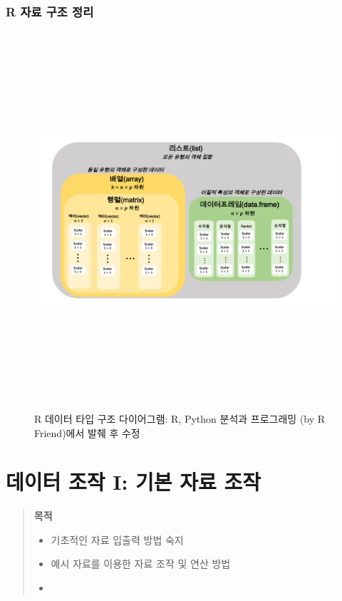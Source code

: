 \documentclass[11pt,a4paper]{book}
\theoremstyle{definition}
\theoremstyle{definition}
\theoremstyle{definition}
\theoremstyle{remark}
\begin{document}
\normalsize

\subsection{R 자료 구조 정리}\label{r---}

\begin{figure}[H] {
  \centering
  \includegraphics[width = 15cm, height = 14cm]{Figures/datatype-diagram}
  \caption[R 데이터 타입 구조 다이어그램]{R 데이터 타입 구조 다이어그램: R, Python 분석과 프로그래밍 (by R Friend)에서 발췌 후 수정}\label{fig:R-datatype}
} \end{figure}

\vspace{1cm}

\chapter{데이터 조작 I: 기본 자료 조작}\label{--i---}

\begin{quote}
\colorbox{gray!10}{\begin{minipage}{15cm}
\textbf{목적}
\begin{itemize}
  \item 기초적인 자료 입출력 방법 숙지
  \item 예시 자료를 이용한 자료 조작 및 연산 방법
  \item 
\end{itemize}
\end{minipage}}
\end{quote}
\end{document}
